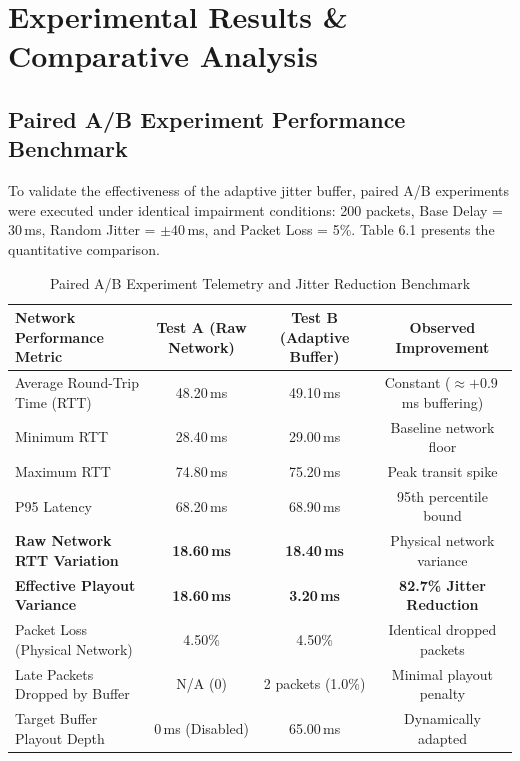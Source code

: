 \documentclass[12pt, a4paper]{report}
\begin{document}
\newpage
\chapter{Experimental Results \& Comparative Analysis}

\section{Paired A/B Experiment Performance Benchmark}
To validate the effectiveness of the adaptive jitter buffer, paired A/B experiments were executed under identical impairment conditions: 200 packets, Base Delay = 30\,ms, Random Jitter = $\pm 40$\,ms, and Packet Loss = 5\%. Table 6.1 presents the quantitative comparison.

\begin{table}[H]
\centering
\begin{tabularx}{\textwidth}{|L|c|c|c|}
\hline
\textbf{Network Performance Metric} & \textbf{Test A (Raw Network)} & \textbf{Test B (Adaptive Buffer)} & \textbf{Observed Improvement} \\
\hline
Average Round-Trip Time (RTT) & 48.20\,ms & 49.10\,ms & Constant ($\approx +0.9$\,ms buffering) \\
\hline
Minimum RTT & 28.40\,ms & 29.00\,ms & Baseline network floor \\
\hline
Maximum RTT & 74.80\,ms & 75.20\,ms & Peak transit spike \\
\hline
P95 Latency & 68.20\,ms & 68.90\,ms & 95th percentile bound \\
\hline
\textbf{Raw Network RTT Variation} & \textbf{18.60\,ms} & \textbf{18.40\,ms} & Physical network variance \\
\hline
\textbf{Effective Playout Variance} & \textbf{18.60\,ms} & \textbf{3.20\,ms} & \textbf{82.7\% Jitter Reduction} \\
\hline
Packet Loss (Physical Network) & 4.50\% & 4.50\% & Identical dropped packets \\
\hline
Late Packets Dropped by Buffer & N/A (0) & 2 packets (1.0\%) & Minimal playout penalty \\
\hline
Target Buffer Playout Depth & 0\,ms (Disabled) & 65.00\,ms & Dynamically adapted \\
\hline
\end{tabularx}
\caption{Paired A/B Experiment Telemetry and Jitter Reduction Benchmark}
\label{tab:ab_results}
\end{table}
\end{document}
